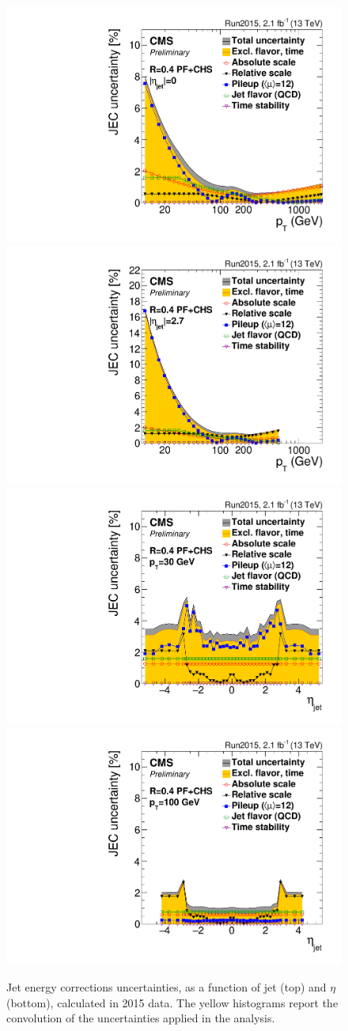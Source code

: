 \begin{figure}[!htb]
  \centering
    \includegraphics[width=.5\textwidth]{figures/JetPlots/JECUncert_DATA_Summary_AK4PFchs_Eta00.pdf}%
    \includegraphics[width=.5\textwidth]{figures/JetPlots/JECUncert_DATA_Summary_AK4PFchs_Eta27.pdf}
\\
    \includegraphics[width=.5\textwidth]{figures/JetPlots/JECUncert_DATA_Summary_AK4PFchs_Pt30.pdf}%
    \includegraphics[width=.5\textwidth]{figures/JetPlots/JECUncert_DATA_Summary_AK4PFchs_Pt100.pdf}

  \caption{Jet energy corrections uncertainties, as a function of jet \pt (top) and $\eta$ (bottom), calculated in 2015 data. The yellow histograms report the convolution of the uncertainties applied in the analysis.}
  \label{fig:plot_JEC_unc}
\end{figure}

